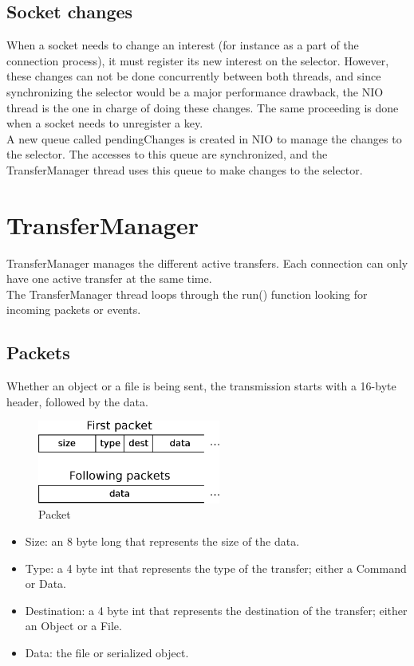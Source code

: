 \documentclass[11pt]{article}
\begin{document}
\subsection{Socket changes}
	When a socket needs to change an interest (for instance as a part of the connection process), it must register its new interest on the selector. However, these changes can not be done concurrently between both threads, and since synchronizing the selector would be a major performance drawback, the NIO thread is the one in charge of doing these changes. The same proceeding is done when a socket needs to unregister a key.\\
	A new queue called pendingChanges is created in NIO to manage the changes to the selector. The accesses to this queue are synchronized, and the TransferManager thread uses this queue to make changes to the selector.

\section{TransferManager}
	TransferManager manages the different active transfers. Each connection can only have one active transfer at the same time.\\
	The TransferManager thread loops through the run() function looking for incoming packets or events. 
	\subsection{Packets}
	Whether an object or a file is being sent, the transmission starts with a 16-byte header, followed by the data.
	\begin{figure}[H]
	\centering
	\includegraphics[width=60mm]{img/drawing4.eps}
	\caption[Packet]{Packet}
	\label{drawing4}
	\end{figure}
	\begin{itemize}
		\item Size: an 8 byte long that represents the size of the data.
		\item Type: a 4 byte int that represents the type of the transfer; either a Command or Data.
		\item Destination: a 4 byte int that represents the destination of the transfer; either an Object or a File.
		\item Data: the file or serialized object.
	\end{itemize}
\end{document}
